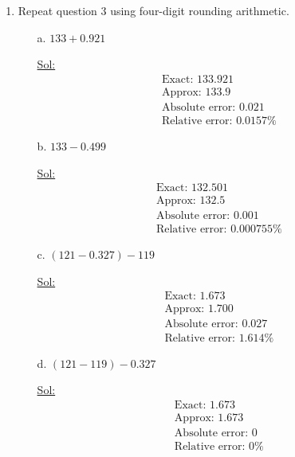 \begin{enumerate}
\item Repeat question 3 using four-digit rounding arithmetic.
  \begin{itemize}
    \item[a.] \( 133 + 0.921 \)

      \underline{Sol:}\\
      \[
        \begin{array}{l}
          \textrm{Exact: } 133.921 \\
          \textrm{Approx: } 133.9 \\
          \textrm{Absolute error: } 0.021 \\
          \textrm{Relative error: } 0.0157\%
        \end{array}
      \]
      \bigbreak

    \item[b.] \( 133 - 0.499 \)

      \underline{Sol:}\\
      \[
        \begin{array}{l}
          \textrm{Exact: } 132.501 \\
          \textrm{Approx: } 132.5 \\
          \textrm{Absolute error: } 0.001 \\
          \textrm{Relative error: } 0.000755\%
        \end{array}
      \]
      \bigbreak

    \item[c.] \( (121 - 0.327) - 119 \)

      \underline{Sol:}\\
      \[
        \begin{array}{l}
          \textrm{Exact: } 1.673 \\
          \textrm{Approx: } 1.700 \\
          \textrm{Absolute error: } 0.027 \\
          \textrm{Relative error: } 1.614\%
        \end{array}
      \]
      \bigbreak

    \item[d.] \( (121 - 119) - 0.327 \)

      \underline{Sol:}\\
      \[
        \begin{array}{l}
          \textrm{Exact: } 1.673 \\
          \textrm{Approx: } 1.673 \\
          \textrm{Absolute error: } 0 \\
          \textrm{Relative error: } 0\%
        \end{array}
      \]
      \bigbreak


\end{itemize}
\end{enumerate}
